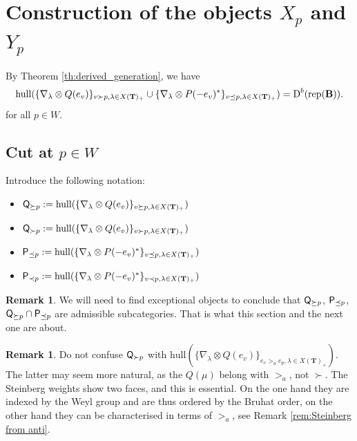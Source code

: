 \documentclass[sn-mathphys-num]{sn-jnl}%
\newcommand{\rep}{{\mathrm{rep}}}
\newcommand{\hull}{{\mathrm{hull}}}
\newcommand*{\Dd}{\mathop{\mathrm D\kern0pt}\nolimits}
\newcommand{\fb}{\mathbf B}
\newcommand{\bt}{\mathbf T}
\theoremstyle{definition}
\newtheorem{remark}[theorem]{Remark}
\begin{document}
\section{Construction of the objects $X_p$ and $Y_p$}\label{sec:X_p&Y_p}
By Theorem \ref{th:derived_generation}, we have
\begin{equation}\label{eq:trianghullP-Q}
\hull( \{\nabla_\lambda\otimes Q(e_v)\}_{v\succ  p,\lambda\in X( \bt)_+}\cup\{\nabla_\lambda\otimes P(-e_v)^*\}_{v\preceq  p,\lambda\in X( \bt)_+})%
=\Dd ^b(\rep( \fb)).
\end{equation}
for all $p\in W$.

\subsection{Cut at $p\in W$}\label{subsec:cut_at_p}



Introduce the following notation: 
\begin{itemize}
\item ${\sf Q}_{\succeq p}:=\hull(\{\nabla_\lambda\otimes Q(e_v)\}_{v\succeq  p,\lambda\in X( \bt)_+})$




\item ${\sf Q}_{\succ p}:=\hull(\{\nabla_\lambda\otimes Q(e_v)\}_{v\succ  p,\lambda\in X( \bt)_+})$





\item ${\sf P}_{\preceq p}:=\hull(\{\nabla_\lambda\otimes P(-e_v)^*\}_{v\preceq  p,\lambda\in X( \bt)_+})$



\item ${\sf P}_{\prec p}:=\hull(\{\nabla_\lambda\otimes P(-e_v)^*\}_{v\prec  p,\lambda\in X( \bt)_+})$

\end{itemize}
\begin{remark}
    We will need to find exceptional objects to conclude that ${\sf Q}_{\succeq p}$, ${\sf P}_{\preceq p}$, ${\sf Q}_{\succeq p}\cap{\sf P}_{\preceq p}$ are admissible subcategories. That is what this section and the next one are about.
\end{remark} 
\begin{remark}
    Do not confuse ${\sf Q}_{\succ p}$
    with $\hull(\{\nabla_\lambda\otimes Q(e_v)\}_{e_v>_a  e_p,\lambda\in X( \bt)_+})$.
    The latter may seem more natural, as the $Q(\mu)$ belong with $>_a$, not $\succ$.
    The Steinberg weights
    show two faces, and this is essential. On the one hand they are indexed by the Weyl group and are thus
    ordered by the Bruhat order, on the other hand they can be characterised  in terms of $>_a$, see Remark \ref{rem:Steinberg from anti}.
\end{remark}
\end{document}
